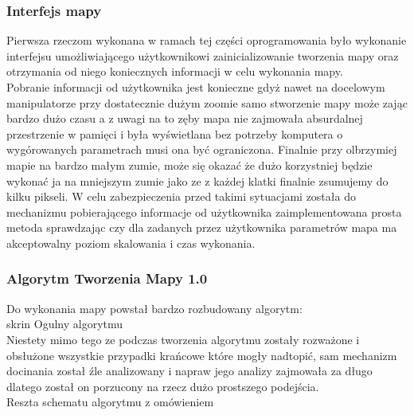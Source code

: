 \documentclass[11pt,a4paper]{article}
\begin{document}
    \subsubsection{Interfejs mapy}
    \hspace{1cm} Pierwsza rzeczom wykonana w ramach tej części oprogramowania było wykonanie interfejsu umożliwiającego użytkownikowi zainicializowanie tworzenia mapy oraz otrzymania od niego koniecznych informacji w celu wykonania mapy.\\
    \hspace{1cm} Pobranie informacji od użytkownika jest konieczne gdyż nawet na docelowym manipulatorze przy dostatecznie dużym zoomie samo stworzenie mapy może zając bardzo dużo czasu a z uwagi na to zęby mapa nie zajmowała absurdalnej przestrzenie w pamięci i była wyświetlana bez potrzeby komputera o wygórowanych parametrach musi ona być ograniczona. Finalnie przy olbrzymiej mapie na bardzo małym zumie, może się okazać że dużo korzystniej będzie wykonać ja na mniejszym zumie jako ze z każdej klatki finalnie zsumujemy do kilku pikseli. W celu zabezpieczenia przed takimi sytuacjami została do mechanizmu pobierającego informacje od użytkownika zaimplementowana prosta metoda sprawdzając czy dla zadanych przez użytkownika parametrów mapa ma akceptowalny poziom skalowania i czas wykonania.\\

    \subsubsection{Algorytm Tworzenia Mapy 1.0}
    \hspace{1cm} Do wykonania mapy powstał bardzo rozbudowany algorytm:\\
    {\color{red} skrin Ogulny algorytmu}\\
    Niestety mimo tego ze podczas tworzenia algorytmu zostały rozważone i obsłużone wszystkie przypadki krańcowe które mogły nadtopić, sam mechanizm docinania został źle analizowany i napraw jego analizy zajmowała za długo dlatego został on porzucony na rzecz dużo prostszego podejścia.\\
    {\color{red} Reszta schematu algorytmu z omówieniem}\\
\end{document}
